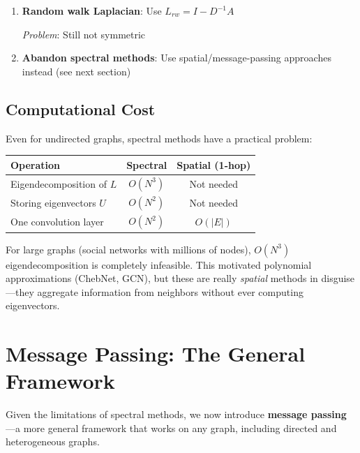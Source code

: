 \begin{notechapter}
\begin{enumerate}
          \textit{Advantage}: Eigenvalues stay real
          
          \textit{Problem}: How to choose the phases $\theta_{ij}$?
          
    \item \textbf{Random walk Laplacian}: Use $L_{rw} = I - D^{-1}A$
    
          \textit{Problem}: Still not symmetric
          
    \item \textbf{Abandon spectral methods}: Use spatial/message-passing 
          approaches instead (see next section)
\end{enumerate}

\subsection{Computational Cost}

Even for undirected graphs, spectral methods have a practical problem:

\begin{center}
\begin{tabular}{lcc}
\toprule
\textbf{Operation} & \textbf{Spectral} & \textbf{Spatial (1-hop)} \\
\midrule
Eigendecomposition of $L$ & $O(N^3)$ & Not needed \\
Storing eigenvectors $U$ & $O(N^2)$ & Not needed \\
One convolution layer & $O(N^2)$ & $O(|E|)$ \\
\bottomrule
\end{tabular}
\end{center}

For large graphs (social networks with millions of nodes), $O(N^3)$ 
eigendecomposition is completely infeasible. This motivated polynomial 
approximations (ChebNet, GCN), but these are really \emph{spatial} 
methods in disguise---they aggregate information from neighbors without 
ever computing eigenvectors.

\section{Message Passing: The General Framework}

Given the limitations of spectral methods, we now introduce 
\textbf{message passing} \cite{dft-to-gnn:gilmer2017neural}---a more general framework 
that works on any graph, including directed and heterogeneous graphs.


\end{notechapter}
